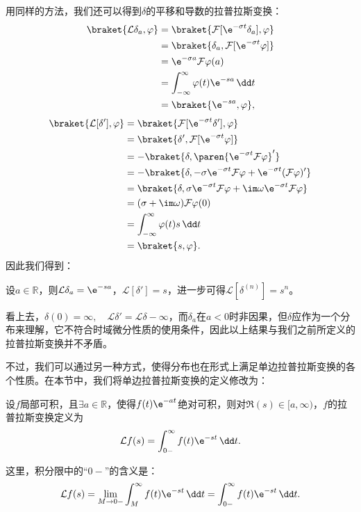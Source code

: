 用同样的方法，我们还可以得到$\delta$的平移和导数的拉普拉斯变换：
\begin{align}
    \braket{\mathcal{L}\delta_a,\varphi}&=\braket{\mathcal{F}[\e^{-\sigma t}\delta_a],\varphi}\nonumber\\
    &=\braket{\delta_a,\mathcal{F}[\e^{-\sigma t}\varphi]}\nonumber\\
    &=\e^{-\sigma a}\mathcal{F}\varphi(a)\nonumber\\
    &=\int_{-\infty}^{\infty}\varphi(t)\e^{-sa}\,\dd t\nonumber\\
    &=\braket{\e^{-sa},\varphi},
\end{align}
\begin{align}
    \braket{\mathcal{L}[\delta'],\varphi}&=\braket{\mathcal{F}[\e^{-\sigma t}\delta'],\varphi}\nonumber\\
    &=\braket{\delta',\mathcal{F}[\e^{-\sigma t}\varphi]}\nonumber\\
    &=-\braket{\delta,\paren{\e^{-\sigma t}\mathcal{F}\varphi}'}\nonumber\\
    &=-\braket{\delta,-\sigma\e^{-\sigma t}\mathcal{F}\varphi+\e^{-\sigma t}(\mathcal{F}\varphi)'}\nonumber\\
    &=\braket{\delta,\sigma\e^{-\sigma t}\mathcal{F}\varphi+\im\omega\e^{-\sigma t}\mathcal{F}\varphi}\nonumber\\
    &=(\sigma+\im\omega)\mathcal{F}\varphi(0)\nonumber\\
    &=\int_{-\infty}^{\infty}\varphi(t)s\,\dd t\nonumber\\
    &=\braket{s,\varphi}.
\end{align}
因此我们得到：
\begin{proposition}
    设$a\in\mathbb{R}$，则$\mathcal{L}\delta_a=\e^{-sa}$，$\mathcal{L}[\delta']=s$，进一步可得$\mathcal{L}[\delta^{(n)}]=s^n$。
\end{proposition}

看上去，$\delta(0)=\infty,\quad \mathcal{L}\delta'=\mathcal{L}\delta-\infty$，而$\delta_a$在$a<0$时非因果，但$\delta$应作为一个分布来理解，它不符合时域微分性质的使用条件，因此以上结果与我们之前所定义的拉普拉斯变换并不矛盾。

不过，我们可以通过另一种方式，使得分布也在形式上满足单边拉普拉斯变换的各个性质。在本节中，我们将单边拉普拉斯变换的定义修改为：
\begin{definition}
    设$f$局部可积，且$\exists a\in\mathbb{R}$，使得$f(t)\e^{-at}$绝对可积，则对$\Re(s)\in[a,\infty)$，$f$的拉普拉斯变换定义为
    \begin{equation}
        \mathcal{L}f(s)=\int_{0-}^{\infty}f(t)\e^{-st}\,\dd t.
    \end{equation}
\end{definition}
这里，积分限中的“$0-$”的含义是：
\begin{equation}
    \mathcal{L}f(s)=\lim_{M\to 0-}\int_{M}^{\infty}f(t)\e^{-st}\,\dd t=\int_{0-}^{\infty}f(t)\e^{-st}\,\dd t.
\end{equation}

